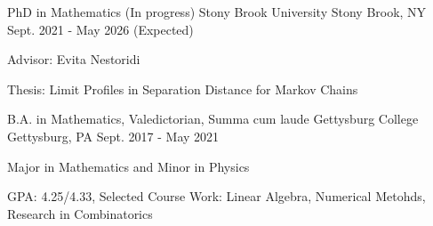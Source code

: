 
\begin{cventries}

	\cventryedu
		{PhD in Mathematics (In progress)} %
		{Stony Brook University} %
		{Stony Brook, NY} %
		{Sept. 2021 - May 2026 (Expected)} %
		{ %
			\begin{cvitems}
				\item Advisor: Evita Nestoridi
				\item Thesis: Limit Profiles in Separation Distance for Markov Chains
			\end{cvitems}
		}

	\cventryedu
		{B.A. in Mathematics, Valedictorian, Summa cum laude} %
		{Gettysburg College} %
		{Gettysburg, PA} %
		{Sept. 2017 - May 2021} %
		{ %
			\begin{cvitems}
				\item Major in Mathematics and Minor in Physics
				\item GPA: 4.25/4.33, Selected Course Work: Linear Algebra, Numerical Metohds, Research in Combinatorics
			\end{cvitems}
		}

\end{cventries}
